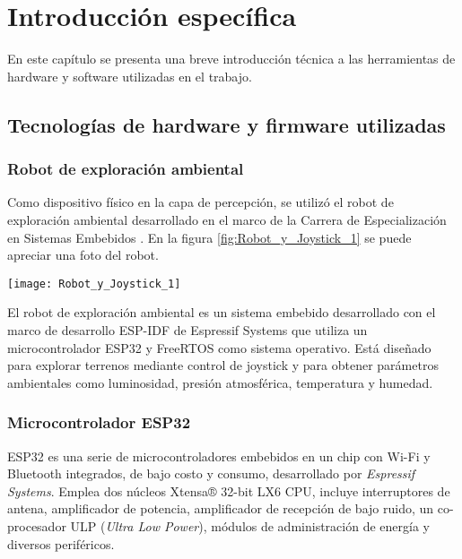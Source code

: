 \chapter{Introducción específica} %

\label{Chapter2}



En este capítulo se presenta una breve introducción técnica a las herramientas de hardware y software utilizadas en el trabajo.

\section{Tecnologías de hardware y firmware utilizadas}


\subsection{Robot de exploración ambiental}

Como dispositivo físico en la capa de percepción, se utilizó el robot de exploración ambiental desarrollado en el marco de la Carrera de Especialización en Sistemas Embebidos \citep{cese_gonzalo_memoria}. En la figura \ref{fig:Robot_y_Joystick_1} se puede apreciar una foto del robot.


\begin{center}
   \texttt{[image: Robot\_y\_Joystick\_1]}
   \label{fig:Robot_y_Joystick_1}
\end{center}

El robot de exploración ambiental es un sistema embebido desarrollado con el marco de desarrollo ESP-IDF \cite{ESPIDF_home} de Espressif Systems que utiliza un microcontrolador ESP32 \cite{ESP32} y FreeRTOS \citep{FreeRTOS} como sistema operativo. Está diseñado para explorar terrenos mediante control de joystick y para obtener parámetros ambientales como luminosidad, presión atmosférica, temperatura y humedad.

\subsection{Microcontrolador ESP32}


ESP32 \cite{ESP32} es una serie de microcontroladores embebidos en un chip con Wi-Fi y Bluetooth integrados, de bajo costo y consumo, desarrollado por \textit{Espressif Systems}. Emplea dos núcleos Xtensa® 32-bit LX6 CPU, incluye interruptores de antena, amplificador de potencia, amplificador de recepción de bajo ruido, un co-procesador ULP (\textit{Ultra Low Power}), módulos de administración de energía y diversos periféricos.


